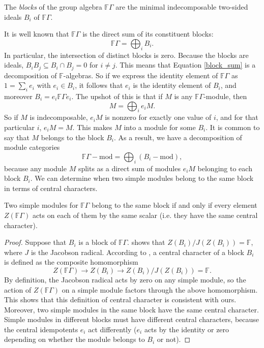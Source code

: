 \begin{definition}
The \emph{blocks} of the group algebra $\mathbb{F}\Gamma$ are the minimal indecomposable two-sided ideals $B_i$ of $\mathbb{F}\Gamma$.
\end{definition}

It is well known that $\mathbb{F}\Gamma$ is the direct sum of its constituent blocks:
\begin{equation} \label{block_sum}
\mathbb{F}\Gamma = \bigoplus_i B_i.
\end{equation}
In particular, the intersection of distinct blocks is zero. Because the blocks are ideals, $B_i B_j \subseteq B_i \cap B_j = 0$ for $i \neq j$. This means that Equation \eqref{block_sum} is a decomposition of $\mathbb{F}$-algebras. So if we express the identity element of $\mathbb{F}\Gamma$ as $1 = \sum_i e_i$ with $e_i \in B_i$, it follows that $e_i$ is the identity element of $B_i$, and moreover $B_i = e_i \mathbb{F}\Gamma e_i$. The upshot of this is that if $M$ is any $\mathbb{F}\Gamma$-module, then
\[
M = \bigoplus_i e_i M.
\]
So if $M$ is indecomposable, $e_i M$ is nonzero for exactly one value of $i$, and for that particular $i$, $e_i M = M$. This makes $M$ into a module for some $B_i$. It is common to say that $M$ belongs to the block $B_i$. As a result, we have a decomposition of module categories
\[
\mathbb{F}\Gamma - \mathrm{mod} = \bigoplus_i \left(B_i -\mathrm{mod}\right),
\]
because any module $M$ splits as a direct sum of modules $e_iM$ belonging to each block $B_i$. We can determine when two simple modules belong to the same block in terms of central characters.

\begin{proposition} \label{central_char_blocks}
Two simple modules for $\mathbb{F}\Gamma$ belong to the same block if and only if every element $Z(\mathbb{F}\Gamma)$ acts on each of them by the same scalar \textup{(}i.e. they have the same central character\textup{)}. 
\end{proposition}
\begin{proof}
Suppose that $B_i$ is a block of $\mathbb{F}\Gamma$.  \cite[Lemma 4.1]{modrepfingrp} shows that $Z(B_i)/J(Z(B_i)) = \mathbb{F}$, where $J$ is the Jacobson radical. According to  \cite{modrepfingrp}, a central character of a block $B_i$ is defined as the composite homomorphism
\[
Z(\mathbb{F}\Gamma) \to Z(B_i) \to Z(B_i)/J(Z(B_i)) = \mathbb{F}.
\]
By definition, the Jacobson radical acts by zero on any simple module, so the action of $Z(\mathbb{F}\Gamma)$ on a simple module factors through the above homomorphism. This shows that this definition of central character is consistent with ours. Moreover, two simple modules in the same block have the same central character. Simple modules in different blocks must have different central characters, because the central idempotents $e_i$ act differently ($e_i$ acts by the identity or zero depending on whether the module belongs to $B_i$ or not).
\end{proof}

